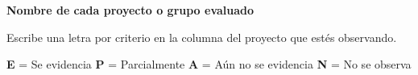 \textbf{Nombre de cada proyecto o grupo evaluado}\par
\begin{minipage}[t]{0.235\linewidth}\end{minipage}\hfill
\begin{minipage}[t]{0.235\linewidth}\end{minipage}\hfill
\begin{minipage}[t]{0.235\linewidth}\end{minipage}\hfill
\begin{minipage}[t]{0.235\linewidth}\end{minipage}\par

\vspace{5pt}
\fontsize{10bp}{11.3pt}\selectfont
Escribe una letra por criterio en la columna del proyecto que estés observando.\par
\textbf{E} = Se evidencia \enspace
\textbf{P} = Parcialmente \enspace
\textbf{A} = Aún no se evidencia \enspace
\textbf{N} = No se observa\par
\vspace{3pt}

\renewcommand{\arraystretch}{1.1}

